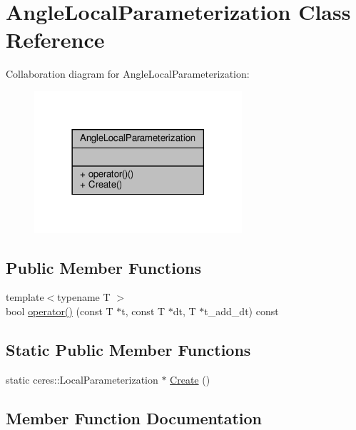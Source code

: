 \hypertarget{classAngleLocalParameterization}{}\section{Angle\+Local\+Parameterization Class Reference}
\label{classAngleLocalParameterization}


Collaboration diagram for Angle\+Local\+Parameterization\+:\nopagebreak
\begin{figure}[H]
\begin{center}
\leavevmode
\includegraphics[width=218pt]{d4/da6/classAngleLocalParameterization__coll__graph}
\end{center}
\end{figure}
\subsection*{Public Member Functions}
\begin{DoxyCompactItemize}
\item 
{\footnotesize template$<$typename T $>$ }\\bool \hyperlink{classAngleLocalParameterization_a4395ea0db2ce1f4155d6a75931fcdff1}{operator()} (const T $\ast$t, const T $\ast$dt, T $\ast$t\+\_\+add\+\_\+dt) const
\end{DoxyCompactItemize}
\subsection*{Static Public Member Functions}
\begin{DoxyCompactItemize}
\item 
static ceres\+::\+Local\+Parameterization $\ast$ \hyperlink{classAngleLocalParameterization_a73006f5f3280d4adccfa3612f8188868}{Create} ()
\end{DoxyCompactItemize}


\subsection{Member Function Documentation}
\mbox{\label{classAngleLocalParameterization_a73006f5f3280d4adccfa3612f8188868}} 
